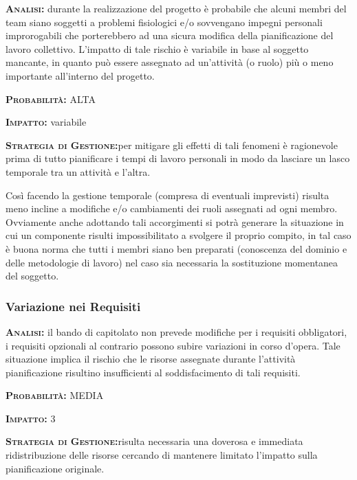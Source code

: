 \begin{description}
	\item{\scshape\bfseries Analisi:} durante la realizzazione del progetto è probabile che alcuni membri del team siano soggetti a problemi fisiologici e/o sovvengano impegni personali improrogabili che porterebbero ad una sicura modifica della pianificazione del lavoro collettivo. L'impatto di tale rischio è variabile in base al soggetto mancante, in quanto può essere assegnato ad un'attività (o ruolo) più o meno importante all'interno del progetto.
	\item{\scshape\bfseries Probabilità:} ALTA
	\item{\scshape\bfseries Impatto:} variabile
	\item{\scshape\bfseries Strategia di Gestione:}per mitigare gli effetti di tali fenomeni è ragionevole prima di tutto pianificare i tempi di lavoro personali in modo da lasciare un lasco temporale tra un attività e l'altra.
	
Così facendo la gestione temporale (compresa di eventuali imprevisti) risulta meno incline a modifiche e/o cambiamenti dei ruoli assegnati ad ogni membro. Ovviamente anche adottando tali accorgimenti si potrà generare la situazione in cui un componente risulti impossibilitato a svolgere il proprio compito, in tal caso è buona norma che tutti i membri siano ben preparati (conoscenza del dominio e delle metodologie di lavoro) nel caso sia necessaria la sostituzione momentanea del soggetto.
\end{description}

\subsubsection{Variazione nei Requisiti}

\begin{description}
	\item{\scshape\bfseries Analisi:} il bando di capitolato non prevede modifiche per i requisiti obbligatori, i requisiti opzionali al contrario possono subire variazioni in corso d'opera. Tale situazione implica il rischio che le risorse assegnate durante l'attività pianificazione risultino insufficienti al soddisfacimento di tali requisiti.
	\item{\scshape\bfseries Probabilità:} MEDIA
	\item{\scshape\bfseries Impatto:} 3
	\item{\scshape\bfseries Strategia di Gestione:}risulta necessaria una doverosa e immediata ridistribuzione delle risorse cercando di mantenere limitato l'impatto sulla pianificazione originale.
\end{description}

